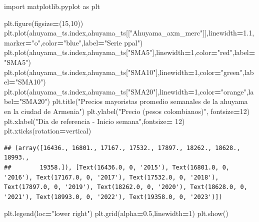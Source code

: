 \documentclass[
]{book}
\newenvironment{Shaded}{\begin{snugshade}}{\end{snugshade}}
\newcommand{\DecValTok}[1]{\textcolor[rgb]{0.00,0.00,0.81}{#1}}
\newcommand{\FloatTok}[1]{\textcolor[rgb]{0.00,0.00,0.81}{#1}}
\newcommand{\ImportTok}[1]{#1}
\newcommand{\NormalTok}[1]{#1}
\newcommand{\OperatorTok}[1]{\textcolor[rgb]{0.81,0.36,0.00}{\textbf{#1}}}
\newcommand{\StringTok}[1]{\textcolor[rgb]{0.31,0.60,0.02}{#1}}
\begin{document}
\begin{Shaded}
\begin{Highlighting}[]

\ImportTok{import}\NormalTok{ matplotlib.pyplot }\ImportTok{as}\NormalTok{ plt}

\NormalTok{plt.figure(figsize}\OperatorTok{=}\NormalTok{(}\DecValTok{15}\NormalTok{,}\DecValTok{10}\NormalTok{))}
\NormalTok{plt.plot(ahuyama\_ts.index,ahuyama\_ts[[}\StringTok{"Ahuyama\_axm\_merc"}\NormalTok{]],linewidth}\OperatorTok{=}\FloatTok{1.1}\NormalTok{,marker}\OperatorTok{=}\StringTok{"o"}\NormalTok{,color}\OperatorTok{=}\StringTok{"blue"}\NormalTok{,label}\OperatorTok{=}\StringTok{"Serie ppal"}\NormalTok{)}
\NormalTok{plt.plot(ahuyama\_ts.index,ahuyama\_ts[}\StringTok{"SMA5"}\NormalTok{],linewidth}\OperatorTok{=}\DecValTok{1}\NormalTok{,color}\OperatorTok{=}\StringTok{"red"}\NormalTok{,label}\OperatorTok{=}\StringTok{"SMA5"}\NormalTok{)}
\NormalTok{plt.plot(ahuyama\_ts.index,ahuyama\_ts[}\StringTok{"SMA10"}\NormalTok{],linewidth}\OperatorTok{=}\DecValTok{1}\NormalTok{,color}\OperatorTok{=}\StringTok{"green"}\NormalTok{,label}\OperatorTok{=}\StringTok{"SMA10"}\NormalTok{)}
\NormalTok{plt.plot(ahuyama\_ts.index,ahuyama\_ts[}\StringTok{"SMA20"}\NormalTok{],linewidth}\OperatorTok{=}\DecValTok{1}\NormalTok{,color}\OperatorTok{=}\StringTok{"orange"}\NormalTok{,label}\OperatorTok{=}\StringTok{"SMA20"}\NormalTok{)}
\NormalTok{plt.title(}\StringTok{"Precios mayoristas promedio semanales de la ahuyama en la ciudad de Armenia"}\NormalTok{)}
\NormalTok{plt.ylabel(}\StringTok{"Precio (pesos colombianos)"}\NormalTok{, fontsize}\OperatorTok{=}\DecValTok{12}\NormalTok{)}
\NormalTok{plt.xlabel(}\StringTok{"Dia de referencia {-} Inicio semana"}\NormalTok{,fontsize}\OperatorTok{=} \DecValTok{12}\NormalTok{)}
\NormalTok{plt.xticks(rotation}\OperatorTok{=}\StringTok{\textquotesingle{}vertical\textquotesingle{}}\NormalTok{)}
\end{Highlighting}
\end{Shaded}

\begin{verbatim}
## (array([16436., 16801., 17167., 17532., 17897., 18262., 18628., 18993.,
##        19358.]), [Text(16436.0, 0, '2015'), Text(16801.0, 0, '2016'), Text(17167.0, 0, '2017'), Text(17532.0, 0, '2018'), Text(17897.0, 0, '2019'), Text(18262.0, 0, '2020'), Text(18628.0, 0, '2021'), Text(18993.0, 0, '2022'), Text(19358.0, 0, '2023')])
\end{verbatim}

\begin{Shaded}
\begin{Highlighting}[]
\NormalTok{plt.legend(loc}\OperatorTok{=}\StringTok{"lower right"}\NormalTok{)}
\NormalTok{plt.grid(alpha}\OperatorTok{=}\FloatTok{0.5}\NormalTok{,linewidth}\OperatorTok{=}\DecValTok{1}\NormalTok{)}
\NormalTok{plt.show()}
\end{Highlighting}
\end{Shaded}
\end{document}
